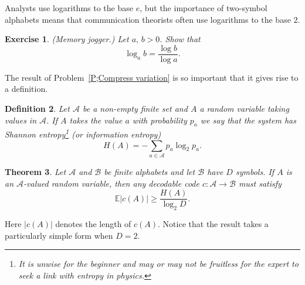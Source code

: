 \documentclass[12pt,a4paper]{article}
\theoremstyle{plain}
\newtheorem{theorem}{Theorem}[section]
\newtheorem{definition}[theorem]{Definition}
\newtheorem{exercise}[theorem]{Exercise}
\theoremstyle{definition}
\begin{document}
Analysts use logarithms to the base $e$, but the importance
of two-symbol alphabets means that communication theorists
often use logarithms to the base $2$.
\begin{exercise}\label{E;Memory} 
(Memory jogger.) Let $a,\,b>0$. Show that
\[\log_{a} b=\frac{\log b}{\log a}.\]
\end{exercise}
The result of Problem~\ref{P;Compress variation}
is so important that it gives rise to a definition.
\begin{definition}\label{D;Shannon entropy} 
Let ${\mathcal A}$ be a 
non-empty finite set and $A$ a random variable taking
values in ${\mathcal A}$. If $A$ takes the value $a$
with probability $p_{a}$ we say that the system has 
\emph{Shannon entropy}\footnote{It is unwise for the beginner
and may or may not be fruitless for the expert
to seek a link with entropy in physics.} 
(or \emph{information entropy})
\[H(A)=-\sum_{a\in {\mathcal A}}p_{a}\log_{2} p_{a}.\]
\end{definition}
\begin{theorem}\label{T;no better} 
Let ${\mathcal A}$ and ${\mathcal B}$
be finite alphabets and let ${\mathcal B}$ have $D$ symbols. If 
$A$ is an ${\mathcal A}$-valued random variable, 
then any decodable code $c:{\mathcal A}\rightarrow{\mathcal B}$
must satisfy 
\[{\mathbb E}|c(A)|\geq \frac{H(A)}{\log_{2} D}.\]
\end{theorem}
Here $|c(A)|$ denotes the length of $c(A)$.
Notice that the result takes a particularly
simple form when $D=2$. 
\end{document}
